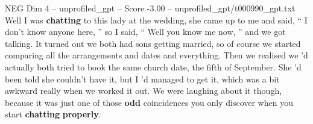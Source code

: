 \begin{textsample}{NEG Dim 4 – unprofiled\_gpt – Score -3.00 – unprofiled\_gpt/t000990\_gpt.txt}  \label{ex:f4_neg_026}
Well I was \textbf{chatting} to this lady at the wedding, she came up to me and said, “ I don't know anyone here, ” so I said, “ Well you know me now, ” and we got talking.
It turned out we both had sons getting married, so of course we started comparing all the arrangements and dates and everything.
Then we realised we ’d actually both tried to book the same church date, the fifth of September.
She ’d been told she couldn't have it, but I ’d managed to get it, which was a bit awkward really when we worked it out.
We were laughing about it though, because it was just one of those \textbf{odd} coincidences you only discover when you start \textbf{chatting} \textbf{properly}.

\end{textsample}
